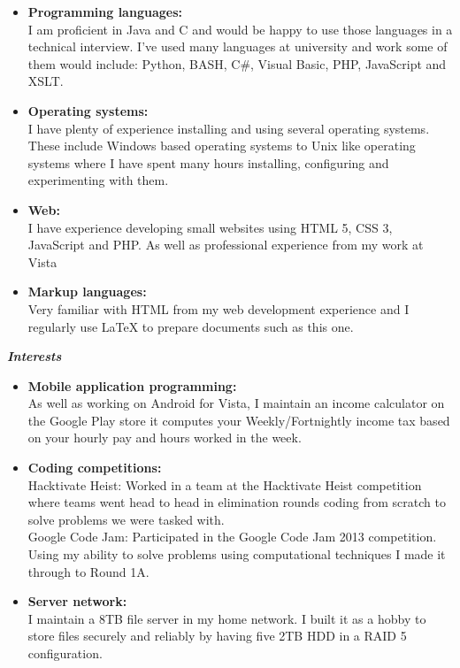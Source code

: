 \documentclass{res}
\begin{document}
\begin{resume}
   \begin{itemize} \itemsep -2pt %
   \item \textbf{Programming languages:} \\ \hfill I am proficient in Java and C and would be happy to use those languages in a technical interview.
   I've used many languages at university and work some of them would include: Python, BASH, C\#, Visual Basic, PHP, JavaScript and XSLT. 
   \item \textbf{Operating systems:} \\ \hfill I have plenty of experience installing and using several operating systems. These include Windows based operating systems to Unix like operating systems where I have spent many hours installing, configuring and experimenting with them.
   \item \textbf{Web:} \\ \hfill I have experience developing small websites using HTML 5, CSS 3, JavaScript and PHP.
   As well as professional experience from my work at Vista
   \item \textbf{Markup languages:} \\ Very familiar with HTML from my web development experience and I regularly use \LaTeX{} to prepare documents such as this one.

 \end{itemize}
 \vspace{0.2in} 
 {\sl \textbf{Interests}}
  
   \begin{itemize} \itemsep -2pt %
   \item \textbf{Mobile application programming:} \\ \hfill As well as working
   on Android for Vista, I maintain an income calculator on the Google Play store
   it computes your Weekly/Fortnightly income tax based on your hourly pay
   and hours worked in the week.
   \item \textbf{Coding competitions:} \\ \hfill Hacktivate Heist:
   Worked in a team at the Hacktivate Heist competition where teams
   went head to head in elimination rounds coding from scratch to
   solve problems we were tasked with.
   \\ Google Code Jam: Participated in the Google Code Jam 2013 
   competition. Using my ability to solve problems using computational 
   techniques I made it through to Round 1A.   
   \item \textbf{Server network:} \\ \hfill I maintain a 8TB file server 
   in my home network. I built it as a hobby to store files securely and 
   reliably by having five 2TB HDD in a RAID 5 configuration.   
 \end{itemize}
 
 
 
 

 
\end{resume} 
\end{document}
